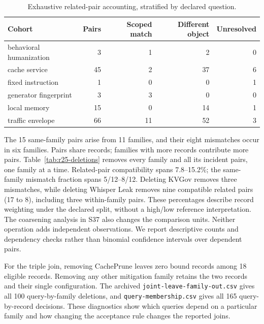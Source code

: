 \begin{table}[ht]\centering\small
\caption{Exhaustive related-pair accounting, stratified by declared question.}\label{tab:r25-cohorts}
\begin{tabular}{@{}lrrrr@{}}\toprule
Cohort & Pairs & Scoped match & Different object & Unresolved\\\midrule
behavioral humanization & 3 & 1 & 2 & 0\\
cache service & 45 & 2 & 37 & 6\\
fixed instruction & 1 & 0 & 0 & 1\\
generator fingerprint & 3 & 3 & 0 & 0\\
local memory & 15 & 0 & 14 & 1\\
traffic envelope & 66 & 11 & 52 & 3\\
\bottomrule\end{tabular}\end{table}
The 15 same-family pairs arise from 11 families, and their eight mismatches occur in six families. Pairs share records; families with more records contribute more pairs. Table~\ref{tab:r25-deletions} removes every family and all its incident pairs, one family at a time. Related-pair compatibility spans 7.8--15.2\%; the same-family mismatch fraction spans 5/12--8/12. Deleting KVGov removes three mismatches, while deleting Whisper Leak removes nine compatible related pairs (17 to 8), including three within-family pairs. These percentages describe record weighting under the declared split, without a high/low reference interpretation. The coarsening analysis in S37 also changes the comparison units. Neither operation adds independent observations. We report descriptive counts and dependency checks rather than binomial confidence intervals over dependent pairs.

For the triple join, removing CachePrune leaves zero bound records among 18 eligible records. Removing any other mitigation family retains the two records and their single configuration. The archived \texttt{joint-leave-family-out.csv} gives all 100 query-by-family deletions, and \texttt{query-membership.csv} gives all 165 query-by-record decisions. These diagnostics show which queries depend on a particular family and how changing the acceptance rule changes the reported joins.

